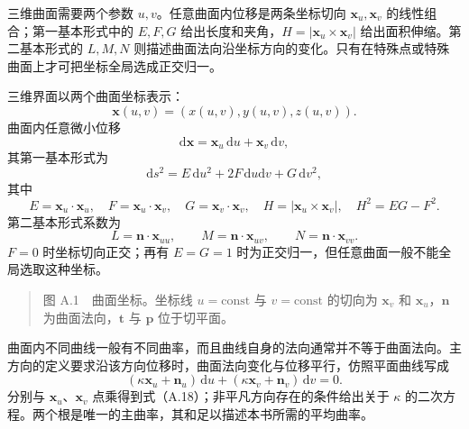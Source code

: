 \documentclass[11pt,a4paper,openany,fontset=none]{ctexbook}
\begin{document}
三维曲面需要两个参数 $u,v$。任意曲面内位移是两条坐标切向 $\bm x_u,\bm x_v$ 的线性组合；第一基本形式中的 $E,F,G$ 给出长度和夹角，$H=|\bm x_u\times\bm x_v|$ 给出面积伸缩。第二基本形式的 $L,M,N$ 则描述曲面法向沿坐标方向的变化。只有在特殊点或特殊曲面上才可把坐标全局选成正交归一。


三维界面以两个曲面坐标表示：
\begin{equation}
 \bm x(u,v)=(x(u,v),y(u,v),z(u,v)). \tag{A.12}
\end{equation}
曲面内任意微小位移
\begin{equation}
 \mathrm d\bm x=\bm x_u\,\mathrm du+\bm x_v\,\mathrm dv, \tag{A.13}
\end{equation}
其第一基本形式为
\begin{equation}
 \mathrm ds^2=E\,\mathrm du^2+2F\,\mathrm du\mathrm dv+G\,\mathrm dv^2, \tag{A.14}
\end{equation}
其中
\begin{equation}
 E=\bm x_u\cdot\bm x_u,\quad F=\bm x_u\cdot\bm x_v,\quad
 G=\bm x_v\cdot\bm x_v,\quad H=|\bm x_u\times\bm x_v|,\quad H^2=EG-F^2. \tag{A.15}
\end{equation}
第二基本形式系数为
\begin{equation}
 L=\bm n\cdot\bm x_{uu},\qquad M=\bm n\cdot\bm x_{uv},\qquad N=\bm n\cdot\bm x_{vv}. \tag{A.16}
\end{equation}
$F=0$ 时坐标切向正交；再有 $E=G=1$ 时为正交归一，但任意曲面一般不能全局选取这种坐标。

\begin{quote}\small 图 A.1　曲面坐标。坐标线 $u=\mathrm{const}$ 与 $v=\mathrm{const}$ 的切向为 $\bm x_v$ 和 $\bm x_u$，$\bm n$ 为曲面法向，$\bm t$ 与 $\bm p$ 位于切平面。\end{quote}
曲面内不同曲线一般有不同曲率，而且曲线自身的法向通常并不等于曲面法向。主方向的定义要求沿该方向位移时，曲面法向变化与位移平行，仿照平面曲线写成
\begin{equation}
 (\kappa\bm x_u+\bm n_u)\,\mathrm du+(\kappa\bm x_v+\bm n_v)\,\mathrm dv=0. \tag{A.17}
\end{equation}
分别与 $\bm x_u$、$\bm x_v$ 点乘得到式（A.18）；非平凡方向存在的条件给出关于 $\kappa$ 的二次方程。两个根是唯一的主曲率，其和足以描述本书所需的平均曲率。
\end{document}
